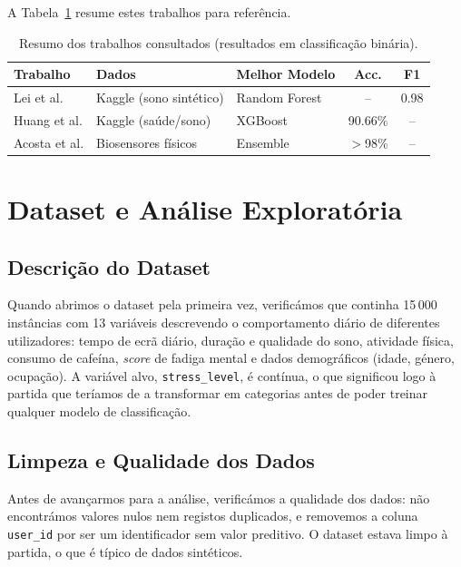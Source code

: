 \documentclass[12pt,a4paper]{article}
\begin{document}
A Tabela~\ref{tab:background_comp} resume estes trabalhos para referência.

\begin{table}[H]
\centering
\small
\caption{Resumo dos trabalhos consultados (resultados em classificação binária).}
\label{tab:background_comp}
\begin{tabular}{p{3.5cm}p{3cm}p{2.5cm}cc}
\toprule
\textbf{Trabalho} & \textbf{Dados} & \textbf{Melhor Modelo} & \textbf{Acc.} & \textbf{F1} \\
\midrule
Lei et al. \cite{lei2024}        & Kaggle (sono sintético) & Random Forest  & --      & 0.98  \\
Huang et al. \cite{huang2024}    & Kaggle (saúde/sono)     & XGBoost        & 90.66\% & --    \\
Acosta et al. \cite{acosta2025}  & Biosensores físicos     & Ensemble       & $>$98\% & --    \\
\bottomrule
\end{tabular}
\end{table}

\section{Dataset e Análise Exploratória}

\subsection{Descrição do Dataset}

Quando abrimos o dataset pela primeira vez, verificámos que continha 15\,000 instâncias
com 13 variáveis descrevendo o comportamento diário de diferentes utilizadores: tempo de
ecrã diário, duração e qualidade do sono, atividade física, consumo de cafeína,
\textit{score} de fadiga mental e dados demográficos (idade, género, ocupação).
A variável alvo, \texttt{stress\_level}, é contínua, o que significou logo à partida
que teríamos de a transformar em categorias antes de poder treinar qualquer modelo
de classificação.

\subsection{Limpeza e Qualidade dos Dados}

Antes de avançarmos para a análise, verificámos a qualidade dos dados: não encontrámos
valores nulos nem registos duplicados, e removemos a coluna \texttt{user\_id} por ser
um identificador sem valor preditivo. O dataset estava limpo à partida, o que é típico
de dados sintéticos.
\end{document}
